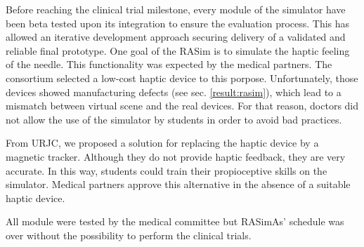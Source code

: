 Before reaching the clinical trial milestone, every module
of the simulator have been beta tested upon its integration to ensure the evaluation process. This has allowed an iterative development approach securing delivery of a validated and reliable final prototype. One goal of the \acs{RASim} is to simulate the haptic feeling of the needle. This functionality was expected by the medical partners. The consortium selected a low-cost haptic device to this porpose. %
Unfortunately, those devices showed manufacturing defects (see sec. \ref{result:rasim}), which lead to a mismatch between virtual scene and the real devices. For that reason, doctors did not allow the use of the simulator by students in order to avoid bad practices.

%
From \acs{URJC}, we proposed a solution for replacing the haptic device by a magnetic tracker. Although they do not provide haptic feedback, they are very accurate. In this way, students could train their propioceptive skills on the simulator. Medical partners approve this alternative in the absence of a suitable haptic device.

All module were tested by the medical committee but \acs{RASimAs}' schedule was over without the possibility to perform the clinical trials.


